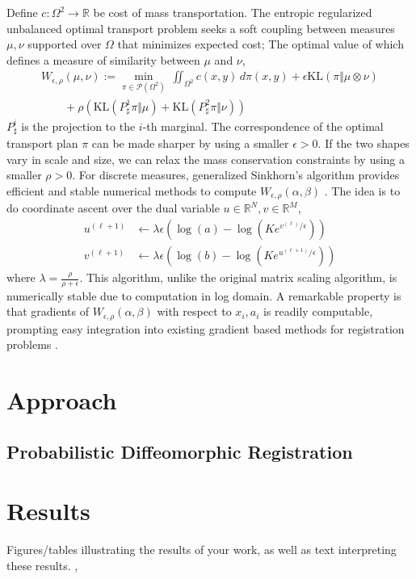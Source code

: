 \documentclass{6838publ}
\newcommand\sP{\ensuremath{\mathcal{P}}}
\newcommand\R{\ensuremath{\mathbb{R}}} %
\begin{document}
Define $c:\Omega^2 \to \R$ be cost of mass transportation. The entropic regularized unbalanced optimal transport problem seeks a soft coupling between measures $\mu,\nu$ supported over $\Omega$ that minimizes expected cost; The optimal value of which defines a measure of similarity between $\mu$ and $\nu$,
\begin{align}
    W_{\epsilon,\rho}(\mu,\nu)
        := \min_{\pi\in\sP(\Omega^2)}\,
            \iint_{\Omega^2} c(x,y)\, d\pi(x,y) + \epsilon \text{KL}(\pi \Vert \mu\otimes\nu) \\
                \quad\quad+\rho\left( \text{KL}(P^1_\sharp \pi \Vert \mu) + \text{KL}(P^2_\sharp \pi \Vert \nu) \right)
    \label{eq:ot_general_measures}
\end{align}
$P^i_\sharp$ is the projection to the $i$-th marginal. The correspondence of the optimal transport plan $\pi$ can be made sharper by using a smaller $\epsilon >0$. If the two shapes vary in scale and size, we can relax the mass conservation constraints by using a smaller $\rho>0$. For discrete measures, generalized Sinkhorn's algorithm provides efficient and stable numerical methods to compute $W_{\epsilon,\rho}(\alpha,\beta)$ \cite{chizatScalingAlgorithmsUnbalanced2017,feydyInterpolatingOptimalTransport2018}. The idea is to do coordinate ascent over the dual variable $u\in\R^N,v\in\R^M$,
\begin{align}
    u^{(\ell+1)}
        &\leftarrow \lambda\epsilon \left( \log(a) - \log(Ke^{v^{(\ell)}/\epsilon}) \right) \\
    v^{(\ell+1)}
        &\leftarrow \lambda\epsilon \left( \log(b) - \log(Ke^{u^{(\ell+1)}/\epsilon}) \right)
    \label{eq:sinkhorn_dual_ascent}
\end{align}
where $\lambda = \frac{\rho}{\rho+\epsilon}$. This algorithm, unlike the original matrix scaling algorithm, is numerically stable due to computation in log domain. A remarkable property is that gradients of $W_{\epsilon,\rho}(\alpha,\beta)$ with respect to $x_i,a_i$ is readily computable, prompting easy integration into existing gradient based methods for registration problems \cite{feydyOptimalTransportDiffeomorphic2017a}. 


\section{Approach}\label{sec:approach}

\subsection{Probabilistic Diffeomorphic Registration}










 



\section{Results}

Figures/tables illustrating the results of your work, as well as text interpreting these results. \cite{peyreComputationalOptimalTransport2020},




\end{document}
